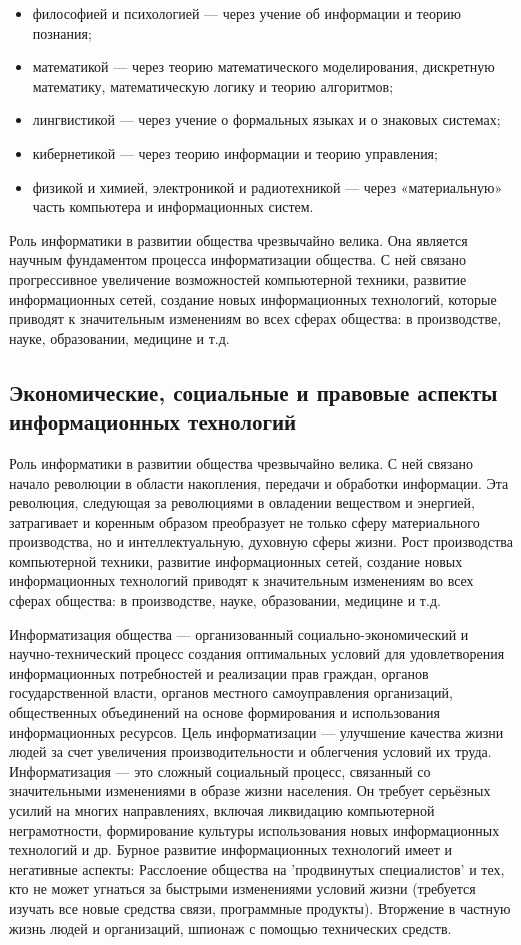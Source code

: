 \documentclass[a4paper]{article}
\begin{document}
\begin{itemize}
\item философией и психологией — через учение об информации и теорию познания;
\item математикой — через теорию математического моделирования, дискретную математику, математическую логику и теорию алгоритмов;
\item лингвистикой — через учение о формальных языках и о знаковых системах;
\item кибернетикой — через теорию информации и теорию управления;
\item физикой и химией, электроникой и радиотехникой — через «материальную» часть компьютера и информационных систем.
\end{itemize}
Роль информатики в развитии общества чрезвычайно велика. Она является научным фундаментом процесса информатизации общества. С ней связано прогрессивное увеличение возможностей компьютерной техники, развитие информационных сетей, создание новых информационных технологий, которые приводят к значительным изменениям во всех сферах общества: в производстве, науке, образовании, медицине и т.д.

\subsection{Экономические, социальные и правовые аспекты информационных технологий}

Роль информатики в развитии общества чрезвычайно велика. С ней связано начало революции в области накопления, передачи и обработки информации. Эта революция, следующая за революциями в овладении веществом и энергией, затрагивает и коренным образом преобразует не только сферу материального производства, но и интеллектуальную, духовную сферы жизни. Рост производства компьютерной техники, развитие информационных сетей, создание новых информационных технологий приводят к значительным изменениям во всех сферах общества: в производстве, науке, образовании, медицине и т.д.

Информатизация общества — организованный социально-экономический и научно-технический процесс создания оптимальных условий для удовлетворения информационных потребностей и реализации прав граждан, органов государственной власти, органов местного самоуправления организаций, общественных объединений на основе формирования и использования информационных ресурсов.
Цель информатизации — улучшение качества жизни людей за счет увеличения производительности и облегчения условий их труда.
Информатизация — это сложный социальный процесс, связанный со значительными изменениями в образе жизни населения. Он требует серьёзных усилий на многих направлениях, включая ликвидацию компьютерной неграмотности, формирование культуры использования новых информационных технологий и др.
Бурное развитие информационных технологий имеет и негативные аспекты:
Расслоение общества на 'продвинутых специалистов' и тех, кто не может угнаться за быстрыми изменениями условий жизни (требуется изучать все новые средства связи, программные продукты).
Вторжение в частную жизнь людей и организаций, шпионаж с помощью технических средств.
\end{document}
